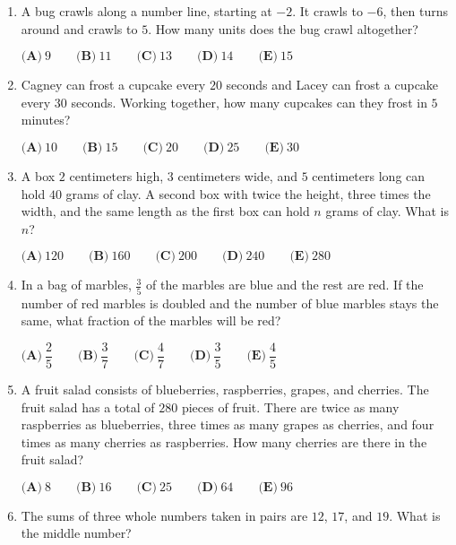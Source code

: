 \documentclass{article}
\begin{document}
\begin{enumerate}[label=\arabic*., itemsep=0.5em]
\item A bug crawls along a number line, starting at \(-2\). It crawls to \(-6\), then turns around and crawls to \(5\). How many units does the bug crawl altogether?

\( \textbf{(A)}\ 9\qquad\textbf{(B)}\ 11\qquad\textbf{(C)}\ 13\qquad\textbf{(D)}\ 14\qquad\textbf{(E)}\ 15 \)\par \vspace{0.5em}\item Cagney can frost a cupcake every \(20\) seconds and Lacey can frost a cupcake every \(30\) seconds. Working together, how many cupcakes can they frost in \(5\) minutes?

\( \textbf{(A)}\ 10\qquad\textbf{(B)}\ 15\qquad\textbf{(C)}\ 20\qquad\textbf{(D)}\ 25\qquad\textbf{(E)}\ 30 \)\par \vspace{0.5em}\item A box \(2\) centimeters high, \(3\) centimeters wide, and \(5\) centimeters long can hold \(40\) grams of clay.  A second box with twice the height, three times the width, and the same length as the first box can hold \(n\) grams of clay.  What is \(n\)?

\(\textbf{(A)}\ 120\qquad\textbf{(B)}\ 160\qquad\textbf{(C)}\ 200\qquad\textbf{(D)}\ 240\qquad\textbf{(E)}\ 280\)\par \vspace{0.5em}\item In a bag of marbles, \(\tfrac{3}{5}\) of the marbles are blue and the rest are red.  If the number of red marbles is doubled and the number of blue marbles stays the same, what fraction of the marbles will be red?

\( \textbf{(A)}\ \dfrac{2}{5}
\qquad\textbf{(B)}\ \dfrac{3}{7}
\qquad\textbf{(C)}\ \dfrac{4}{7}
\qquad\textbf{(D)}\ \dfrac{3}{5}
\qquad\textbf{(E)}\ \dfrac{4}{5}
 \)\par \vspace{0.5em}\item A fruit salad consists of blueberries, raspberries, grapes, and cherries.  The fruit salad has a total of \(280\) pieces of fruit.  There are twice as many raspberries as blueberries, three times as many grapes as cherries, and four times as many cherries as raspberries.  How many cherries are there in the fruit salad?

\( \textbf{(A)}\ 8\qquad\textbf{(B)}\ 16\qquad\textbf{(C)}\ 25\qquad\textbf{(D)}\ 64\qquad\textbf{(E)}\ 96 \)\par \vspace{0.5em}\item The sums of three whole numbers taken in pairs are \(12\), \(17\), and \(19\).  What is the middle number?


\end{enumerate}
\end{document}
